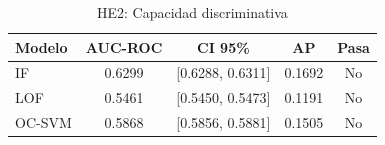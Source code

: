 \begin{table}[htbp]
\centering
\small
\caption{HE2: Capacidad discriminativa}
\label{tab:he2-results}
\begin{tabular}{lcccc}
\toprule
Modelo & AUC-ROC & CI 95\% & AP & Pasa \\
\midrule
  IF & 0.6299 & [0.6288, 0.6311] & 0.1692 & No \\
  LOF & 0.5461 & [0.5450, 0.5473] & 0.1191 & No \\
  OC-SVM & 0.5868 & [0.5856, 0.5881] & 0.1505 & No \\
\bottomrule
\end{tabular}
\end{table}
